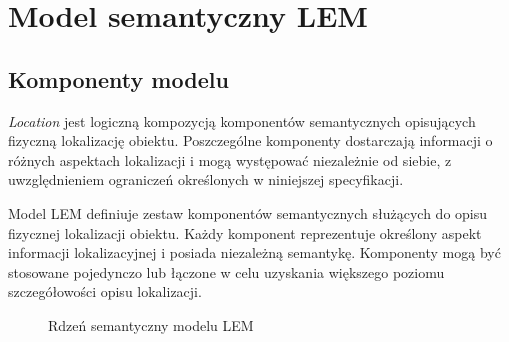 
\chapter{Model semantyczny LEM}
\label{chap:model}

\section{Komponenty modelu}
\label{sec:komponenty}
\textit{Location} jest logiczną kompozycją komponentów semantycznych opisujących fizyczną lokalizację obiektu. Poszczególne komponenty dostarczają informacji o różnych aspektach lokalizacji i mogą występować niezależnie od siebie, z uwzględnieniem ograniczeń określonych w niniejszej specyfikacji.

Model LEM definiuje zestaw komponentów semantycznych służących do opisu fizycznej lokalizacji obiektu. Każdy komponent reprezentuje określony aspekt informacji lokalizacyjnej i posiada niezależną semantykę. Komponenty mogą być stosowane pojedynczo lub łączone w celu uzyskania większego poziomu szczegółowości opisu lokalizacji.

\begin{figure}[htbp]
\centering
{}
\caption{Rdzeń semantyczny modelu LEM}
\label{fig:lem-core}
\end{figure}

